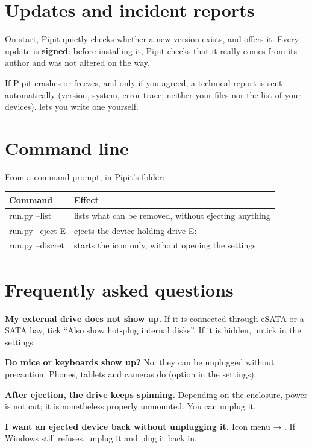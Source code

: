 \section{Updates and incident reports}

On start, Pipit quietly checks whether a new version exists, and offers it. Every update
is \textbf{signed}: before installing it, Pipit checks that it really comes from its
author and was not altered on the way.

If Pipit crashes or freezes, and only if you agreed, a technical report is sent
automatically (version, system, error trace; neither your files nor the list of your
devices).  lets you write one yourself.

\section{Command line}

From a command prompt, in Pipit's folder:

\begin{center}
\begin{tabularx}{\linewidth}{>{\ttfamily\small}l X}
\toprule
\textrm{\textbf{Command}} & \textbf{Effect} \\
\midrule
run.py --list & lists what can be removed, without ejecting anything \\
run.py --eject E & ejects the device holding drive E: \\
run.py --discret & starts the icon only, without opening the settings \\
\bottomrule
\end{tabularx}
\end{center}

\section{Frequently asked questions}

\textbf{My external drive does not show up.} If it is connected through eSATA or a SATA
bay, tick “Also show hot-plug internal disks”. If it is hidden, untick  in the
settings.

\textbf{Do mice or keyboards show up?} No: they can be unplugged without precaution. Phones,
tablets and cameras do (option in the settings).

\textbf{After ejection, the drive keeps spinning.} Depending on the enclosure, power is not
cut; it is nonetheless properly unmounted. You can unplug it.

\textbf{I want an ejected device back without unplugging it.} Icon menu →
. If Windows still refuses, unplug it and plug it back in.


